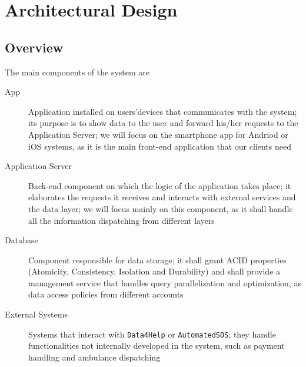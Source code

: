 \documentclass[../DD0.tex]{subfiles}
\begin{document}
\newcommand{\fetchUML}[4] {

  \begin{figure}[h!]

    \centering
    \hspace*{-#4cm}
    \texttt{[image: img/UML/\#1.jpg]}
    \caption{#2}
    \label{fig:#1}

  \end{figure}

}


\def \AccountManager {\texttt{AccountManager}}
\def \DataCollector {\texttt{DataCollector}}
\def \EmergencyDetector {\texttt{EmergencyDetector}}
\def \PaymentGateway {\texttt{PaymentGateway}}
\def \NotificationManager {\texttt{NotificationManager}}
\def \EmergencyDispatcher {\texttt{EmergencyDispatcher}}
\def \FilterManager {\texttt{FilterManager}}
\def \RequestManager {\texttt{RequestManager}}
\def \SetBuilder {\texttt{SetBuilder}}

\section{Architectural Design}
\label{sec:arcdes}

  \subsection{Overview}
  \label{sec:overview}

    The main components of the system are
    \begin{description}
      \item[App] Application installed on users'devices that communicates with the system; its purpose is to show data to the user and forward his/her requests to the Application Server; we will focus on the smartphone app for Andriod or iOS systems, as it is the main front-end application that our clients need
      \item[Application Server] Back-end component on which the logic of the application takes place; it elaborates the requests it receives and interacts with external services and the data layer; we will focus mainly on this component, as it shall handle all the information dispatching from different layers
      \item[Database] Component responsible for data storage; it shall grant ACID properties (Atomicity, Consistency, Isolation and Durability) and shall provide a management service that handles query parallelization and optimization, as data access policies from different accounts
      \item[External Systems] Systems that interact with \texttt{Data4Help} or \texttt{AutomatedSOS}; they handle functionalities not internally developed in the system, such as payment handling and ambulance dispatching
    \end{description}
\end{document}
